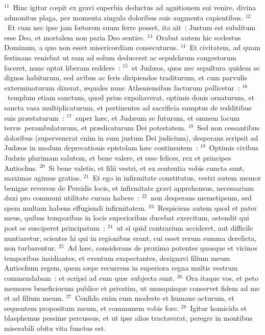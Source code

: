 ${}^{11}$~Hinc igitur cœpit ex gravi superbia deductus ad agnitionem sui venire, divina admonitus plaga, per momenta singula doloribus suis augmenta capientibus.
${}^{12}$~Et cum nec ipse jam fœtorem suum ferre posset, ita ait~: Justum est subditum esse Deo, et mortalem non paria Deo sentire.
${}^{13}$~Orabat autem hic scelestus Dominum, a quo non esset misericordiam consecuturus.
${}^{14}$~Et civitatem, ad quam festinans veniebat ut eam ad solum deduceret ac sepulchrum congestorum faceret, nunc optat liberam reddere~:
${}^{15}$~et Jud\ae os, quos nec sepultura quidem se dignos habiturum, sed avibus ac feris diripiendos traditurum, et cum parvulis exterminaturum dixerat, \ae quales nunc Atheniensibus facturum pollicetur~:
${}^{16}$~templum etiam sanctum, quod prius expoliaverat, optimis donis ornaturum, et sancta vasa multiplicaturum, et pertinentes ad sacrificia sumptus de redditibus suis pr\ae staturum~:
${}^{17}$~super h\ae c, et Jud\ae um se futurum, et omnem locum terr\ae\ perambulaturum, et pr\ae dicaturum Dei potestatem.
${}^{18}$~Sed non cessantibus doloribus (supervenerat enim in eum justum Dei judicium), desperans scripsit ad Jud\ae os in modum deprecationis epistolam h\ae c continentem~:
${}^{19}$~Optimis civibus Jud\ae is plurimam salutem, et bene valere, et esse felices, rex et principes Antiochus.
${}^{20}$~Si bene valetis, et filii vestri, et ex sententia vobis cuncta sunt, maximas agimus gratias.
${}^{21}$~Et ego in infirmitate constitutus, vestri autem memor benigne reversus de Persidis locis, et infirmitate gravi apprehensus, necessarium duxi pro communi utilitate curam habere~:
${}^{22}$~non desperans memetipsum, sed spem multam habens effugiendi infirmitatem.
${}^{23}$~Respiciens autem quod et pater meus, quibus temporibus in locis superioribus ducebat exercitum, ostendit qui post se susciperet principatum~:
${}^{24}$~ut si quid contrarium accideret, aut difficile nuntiaretur, scientes hi qui in regionibus erant, cui esset rerum summa derelicta, non turbarentur.
${}^{25}$~Ad h\ae c, considerans de proximo potentes quosque et vicinos temporibus insidiantes, et eventum exspectantes, designavi filium meum Antiochum regem, quem s\ae pe recurrens in superiora regna multis vestrum commendabam~: et scripsi ad eum qu\ae\ subjecta sunt.
${}^{26}$~Ora itaque vos, et peto memores beneficiorum publice et privatim, ut unusquisque conservet fidem ad me et ad filium meum.
${}^{27}$~Confido enim eum modeste et humane acturum, et sequentem propositum meum, et communem vobis fore.
${}^{28}$~Igitur homicida et blasphemus pessime percussus, et ut ipse alios tractaverat, peregre in montibus miserabili obitu vita functus est.
